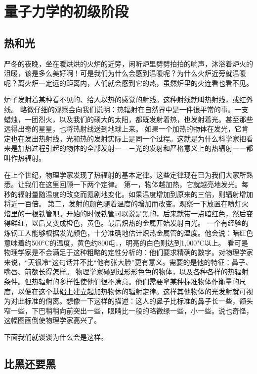 \chapter{量子力学的初级阶段}

\section{热和光}

严冬的夜晚，坐在暖烘烘的火炉的近旁，闲听炉里劈劈拍拍的响声，沐浴着炉火的沮暖，该是多么美好啊！可是我们为什么会感到温暖呢？为什么火炉近旁就温暖呢？离火炉一定远的距离内，人们就会感到它的热，虽然炉里的火连看也看不见。

炉子发射着某种看不见的、给人以热的感觉的射线。这种射线就叫热射线，或红外线。
略微仔细的观察会向我们说明：热辐射在自然界中是一件很平常的事。一支蜡烛，一团烈火，以及我们的硕大的太阳，都既发射着热，也发射着光。甚至那些远得出奇的星星，也将热射线送到地球上来。
如果一个加热的物体在发光，它肯定也在发出热射线。光和热的发射实际上是同一个过程。这就是为什么科学家把看来是加热过程引起的物体的全部发射一—－光的发射和严格意义上的热辐射一一都叫作热辐射。

在上个世纪，物理学家发现了热辐射的基本定律。这些定律现在已为我们大家所熟悉。让我们在这里回顾一下两个定律。
第一，物体越加热，它就越亮地发光。每秒的辐射量随温度的改变而氪剧地变化。如果温度增加到原来的三倍，则辐射增加将近一百倍。
第二，发射的颜色随着温度的增加而改变。观察一下放置在喷灯火焰里的一根铁管吧。开始的时候铁管可以说是黑的，后来就带一点暗红色，然后变得鲜红，以后又变成橙色，黄色。最后炽热的金属开始发射白光。
一个有经验的炼钢工人能够根据发光颜色，十分准确地估计炽热金属管的温度。他会说：暗红色意味着约500°C的温度，黄色约800屯．，明亮的白色则达到1,000"C以上。
看可是物理学家是不会满足于这种粗略的定性分析的：他们要求精确的数字。对物理学家来说，“天很冷“这句话并不比“他有张大脸”更有意义。需要的是他的特征：鼻子、嘴唇、前额长得怎样。
物理学家碰到过形形色色的物体，以及各种各样的热辐射条件。但热辐射的多样性使他们很不满意。他们需要拿某种标准物体作衡量的尺度，以便在这个基础上建立起加热物休的辐射定律。这样其他物体的光发射就可视为对此标准的倘离。想像一下这样的描述：这人的鼻子比标准的鼻子长一些，额头窄一些，下巴稍稍向前突出一些，眼睛比一般的略微绿一些，小一些。说也奇怪，这幅图画倒使物理学家高兴了。

下面我们就谈谈为什么会是这样。

\section{比黑还要黑}

